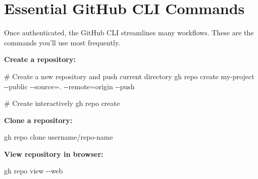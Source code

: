 \documentclass[
  letterpaper,
  DIV=11,
  numbers=noendperiod]{scrreprt}
\newenvironment{Shaded}{\begin{snugshade}}{\end{snugshade}}
\newcommand{\AttributeTok}[1]{\textcolor[rgb]{0.40,0.45,0.13}{#1}}
\newcommand{\CommentTok}[1]{\textcolor[rgb]{0.37,0.37,0.37}{#1}}
\newcommand{\ExtensionTok}[1]{\textcolor[rgb]{0.00,0.23,0.31}{#1}}
\newcommand{\NormalTok}[1]{\textcolor[rgb]{0.00,0.23,0.31}{#1}}
\newcommand{\OperatorTok}[1]{\textcolor[rgb]{0.37,0.37,0.37}{#1}}
\begin{document}
\section{Essential GitHub CLI
Commands}\label{essential-github-cli-commands}

Once authenticated, the GitHub CLI streamlines many workflows. These are
the commands you'll use most frequently.

\textbf{Create a repository:}

\begin{codelisting}

\caption{\texttt{terminal}}

\begin{Shaded}
\begin{Highlighting}[]
\CommentTok{\# Create a new repository and push current directory}
\ExtensionTok{gh}\NormalTok{ repo create my{-}project }\AttributeTok{{-}{-}public} \AttributeTok{{-}{-}source}\OperatorTok{=}\NormalTok{. }\AttributeTok{{-}{-}remote}\OperatorTok{=}\NormalTok{origin }\AttributeTok{{-}{-}push}

\CommentTok{\# Create interactively}
\ExtensionTok{gh}\NormalTok{ repo create}
\end{Highlighting}
\end{Shaded}

\end{codelisting}

\textbf{Clone a repository:}

\begin{codelisting}

\caption{\texttt{terminal}}

\begin{Shaded}
\begin{Highlighting}[]
\ExtensionTok{gh}\NormalTok{ repo clone username/repo{-}name}
\end{Highlighting}
\end{Shaded}

\end{codelisting}

\textbf{View repository in browser:}

\begin{codelisting}

\caption{\texttt{terminal}}

\begin{Shaded}
\begin{Highlighting}[]
\ExtensionTok{gh}\NormalTok{ repo view }\AttributeTok{{-}{-}web}
\end{Highlighting}
\end{Shaded}

\end{codelisting}
\end{document}
